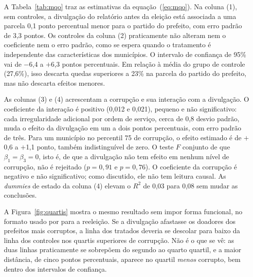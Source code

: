 A Tabela~\ref{tab:mqo} traz as estimativas da equação~(\ref{eq:mqo}). Na coluna (1), sem controles, a
divulgação do relatório antes da eleição está associada a uma parcela 0,1 ponto percentual menor para o
partido do prefeito, com erro padrão de 3,3 pontos. Os controles da coluna (2) praticamente não alteram
nem o coeficiente nem o erro padrão, como se espera quando o tratamento é independente das
características dos municípios. O intervalo de confiança de 95\% vai de $-$6,4 a $+$6,3 pontos percentuais.
Em relação à média do grupo de controle (27,6\%), isso descarta quedas superiores a 23\% na parcela do
partido do prefeito, mas não descarta efeitos menores.

\begin{table}[!htb]
\centering
\caption{Efeito da divulgação do relatório sobre as doações de empresas (MQO)}\label{tab:mqo}
\footnotesize

\end{table}

As colunas (3) e (4) acrescentam a corrupção e sua interação com a divulgação. O coeficiente da interação
é positivo (0,012 e 0,021), pequeno e não significativo: cada irregularidade adicional por ordem de
serviço, cerca de 0,8 desvio padrão, muda o efeito da divulgação em um a dois pontos percentuais, com erro
padrão de três. Para um município no percentil 75 de corrupção, o efeito estimado é de $+$0,6 a $+$1,1
ponto, também indistinguível de zero. O teste $F$ conjunto de que $\beta_1=\beta_3=0$, isto é, de que a
divulgação não tem efeito em nenhum nível de corrupção, não é rejeitado ($p=0{,}91$ e $p=0{,}76$). O
coeficiente da corrupção é negativo e não significativo; como discutido, ele não tem leitura causal. As
\textit{dummies} de estado da coluna (4) elevam o $R^2$ de 0,03 para 0,08 sem mudar as conclusões.

A Figura~\ref{fig:quartis} mostra o mesmo resultado sem impor forma funcional, no formato usado por
 para a reeleição. Se a divulgação afastasse os doadores dos prefeitos mais
corruptos, a linha dos tratados deveria se descolar para baixo da linha dos controles nos quartis
superiores de corrupção. Não é o que se vê: as duas linhas praticamente se sobrepõem do segundo ao quarto
quartil, e a maior distância, de cinco pontos percentuais, aparece no quartil \textit{menos} corrupto,
bem dentro dos intervalos de confiança.

